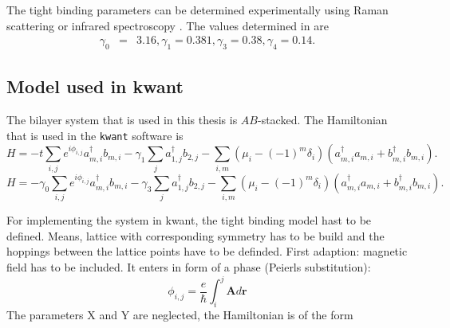 The tight binding parameters can be determined experimentally using Raman scattering \cite{Malard2007} or infrared spectroscopy \cite{Kuzmenko2009}. The values determined in \cite{Kuzmenko2009} are
\begin{eqnarray}
\gamma_0 &=& 3.16,
\gamma_1 = 0.381, 
\gamma_3 = 0.38,
\gamma_4 = 0.14.
\end{eqnarray}

\subsection{Model used in kwant}

The bilayer system that is used in this thesis is $AB$-stacked. The Hamiltonian that is used in the \texttt{kwant} software is
\begin{equation}
H = - t \sum_{i, j} e^{i \phi_{i, j }} a^\dagger_{m, i} b_{m, i} - \gamma_1 \sum_j a_{1, j}^\dagger b_{2, j} - \sum_{i, m} \left( \mu_i - (-1)^m \delta_i\right) \left(a^\dagger_{m, i} a_{m, i} + b^\dagger_{m, i} b_{m, i} \right).
\end{equation}
\begin{equation}
H = - \gamma_0 \sum_{i, j} e^{i \phi_{i, j }} a^\dagger_{m, i} b_{m, i} - \gamma_3 \sum_j a_{1, j}^\dagger b_{2, j} - \sum_{i, m} \left( \mu_i - (-1)^m \delta_i\right) \left(a^\dagger_{m, i} a_{m, i} + b^\dagger_{m, i} b_{m, i} \right).
\end{equation}

For implementing the system in kwant, the tight binding model hast to be defined. Means, lattice with corresponding symmetry has to be build and the hoppings between the lattice points have to be definded.
First adaption: magnetic field has to be included. It enters in form of a phase (Peierls substitution):
\begin{equation}
\phi_{i, j} = \frac{e}{\hbar} \int_i^j \mathbf{A} d\mathbf{r}
\end{equation}
The parameters X and Y are neglected, the Hamiltonian is of the form

